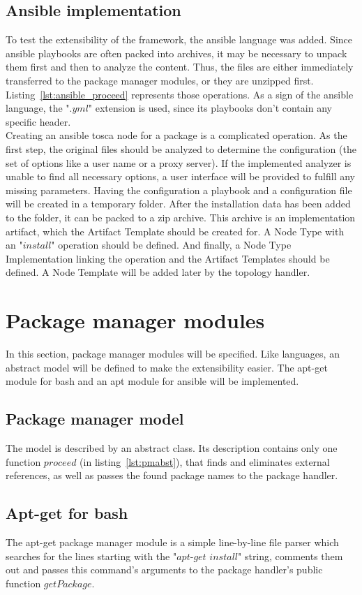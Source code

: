 \subsection*{Ansible implementation}
To test the extensibility of the framework, the ansible language was added.
Since ansible playbooks are often packed into archives, it may be necessary to unpack them first and then to analyze the content.
Thus, the files are either immediately transferred to the package manager modules, or they are unzipped first.
Listing~\ref{lst:ansible_proceed} represents those operations.
As a sign of the ansible language, the ".$yml$" extension is used, since its playbooks don't contain any specific header.\\
Creating an ansible \gls{tosca} node for a package is a complicated operation. 
As the first step, the original files should be analyzed to determine the configuration (the set of options like a user name or a proxy server).
If the implemented analyzer is unable to find all necessary options, a user interface will be provided to fulfill any missing parameters.
Having the configuration a playbook and a configuration file will be created in a temporary folder.
After the installation data has been added to the folder, it can be packed to a zip archive.
This archive is an implementation artifact, which the Artifact Template should be created for.
A Node Type with an "$install$" operation %
should be defined.
And finally, a Node Type Implementation linking the operation and the Artifact Templates should be defined.
A Node Template will be added later by the topology handler.

\section{Package manager modules}
In this section, package manager modules will be specified.
Like languages, an abstract model will be defined to make the extensibility easier.
The apt-get module for bash and an apt module for ansible will be implemented.
\subsection*{Package manager model}
The model is described by an abstract class.
Its description contains only one function $proceed$ (in  listing~\ref{lst:pmabst}), that finds and eliminates external references, as well as passes the found package names to the package handler.
\subsection*{Apt-get for bash}
The apt-get package manager module is a simple line-by-line file parser which searches for the lines starting with the "$apt$-$get$ $install$" string, comments them out and passes this command's arguments to the package handler's public function $getPackage$. 
